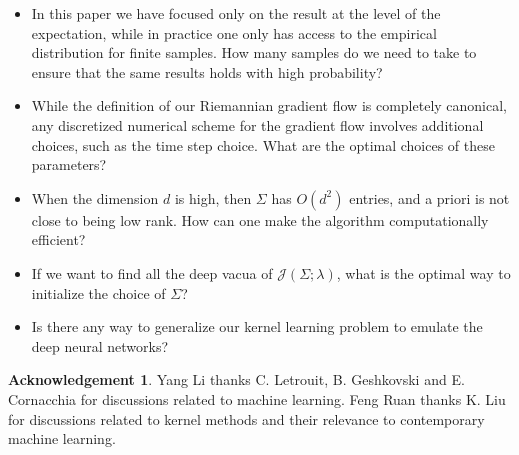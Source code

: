 \documentclass[a4paper]{article}
\theoremstyle{definition}
\newtheorem*{Acknowledgement}{Acknowledgement}
\newcommand{\1}{\mathbbm{1}}
\begin{document}
	
	\begin{itemize}
		\item  In this paper we have focused only on the result at the level of the expectation, while in practice one only has access to the empirical distribution for finite samples. How many samples do we need to take to ensure that the same results holds with high probability?
		
		
		\item  While the definition of our Riemannian gradient flow is completely canonical, any discretized numerical scheme for the gradient flow involves additional choices, such as the time step choice. What are the optimal choices of these parameters?
		
		
		
		\item  When the dimension $d$ is high, then $\Sigma$ has $O(d^2)$ entries, and a priori is not close to being low rank. How can one make the algorithm computationally efficient?
		
		
		
		
		\item 
		
		If we want to find all the deep vacua of $\mathcal{J}(\Sigma;\lambda)$, what is the optimal way to initialize the choice of $\Sigma$? 
		
		
		
		
		\item  Is there any way to generalize our kernel learning problem to emulate the deep neural networks?
		
		
	\end{itemize}
	
	
	
	
	\begin{Acknowledgement}
		Yang Li thanks C. Letrouit, B. Geshkovski and E. Cornacchia for discussions related to machine learning. Feng Ruan thanks K. Liu for discussions related to kernel methods and their relevance to contemporary machine learning.
	\end{Acknowledgement}
	
	
	
\end{document}

